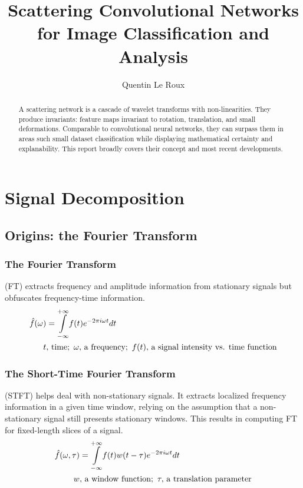 \documentclass[runningheads]{llncs}
\begin{document}
%
\title{Scattering Convolutional Networks for Image Classification and Analysis}
%
%
\author{Quentin Le Roux}
%
%
%
\maketitle              %
%
\begin{abstract}
A scattering network is a cascade of wavelet transforms with non-linearities. They produce invariants: feature maps invariant to rotation, translation, and small deformations. Comparable to convolutional neural networks, they can surpass them in areas such small dataset classification while displaying mathematical certainty and explanability. This report broadly covers their concept and most recent developments.
%
\end{abstract}
%
\section{Signal Decomposition}

\subsection{Origins: the Fourier Transform}

\subsubsection{The Fourier Transform} (FT) extracts frequency and amplitude information from stationary signals but obfuscates frequency-time information.
\begin{align}
    \hat{f}(\omega)&=\underset{-\infty}{\overset{+\infty}{\int}}f(t)e^{-2\pi i \omega t}dt\\
    t&,\,\text{time};\,\,\omega,\,\text{a frequency};\,\,f(t),\,\text{a signal intensity vs. time function}\notag
\end{align}

\subsubsection{The Short-Time Fourier Transform} (STFT) helps deal with non-stationary signals. It extracts localized frequency information in a given time window, relying on the assumption that a non-stationary signal still presents stationary windows. This results in computing FT for fixed-length slices of a signal.
\begin{align}
    \hat{f}(\omega, \tau)&=\underset{-\infty}{\overset{+\infty}{\int}}f(t)w(t-\tau)e^{-2\pi i \omega t}dt\\
    w&,\,\text{a window function};\,\,\tau,\,\text{a translation parameter}\notag
\end{align}
\end{document}
